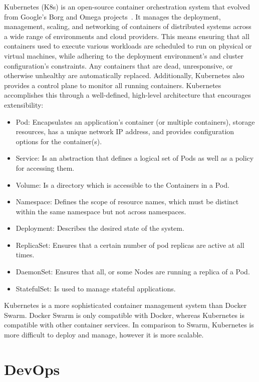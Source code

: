 Kubernetes (K8s) is an open-source container orchestration system that evolved from Google's Borg and Omega projects~\cite{burns2016borg}.
It manages the deployment, management, scaling, and networking of containers of distributed systems across a wide range of environments
and cloud providers.
This means ensuring that all containers used to execute various workloads are scheduled to run on physical or virtual machines,
while adhering to the deployment environment's and cluster configuration's constraints.
Any containers that are dead, unresponsive, or otherwise unhealthy are automatically replaced.
Additionally, Kubernetes also provides a control plane to monitor all running containers.
Kubernetes accomplishes this through a well-defined, high-level architecture that encourages extensibility:

\begin{itemize}
    \item Pod: Encapsulates an application's container (or multiple containers),
    storage resources, has a unique network IP address, and provides configuration options for the container(s).
    \item Service: Is an abstraction that defines a logical set of Pods as well as a policy for accessing them.
    \item Volume: Is a directory which is accessible to the
    Containers in a Pod.
    \item Namespace: Defines the scope of resource names, which must be distinct within the same namespace but not across namespaces.
    \item Deployment: Describes the desired state of the system.
    \item ReplicaSet: Ensures that a certain number of pod replicas are active at all times.
    \item DaemonSet: Ensures that all, or some Nodes are running a replica of a Pod.
    \item StatefulSet: Is used to manage stateful applications.
\end{itemize}

Kubernetes is a more sophisticated container management system than Docker Swarm.
Docker Swarm is only compatible with Docker, whereas Kubernetes is compatible with other container services.
In comparison to Swarm, Kubernetes is more difficult to deploy and manage, however it is more scalable.

\section{DevOps} %
\label{sec:dev_ops}


